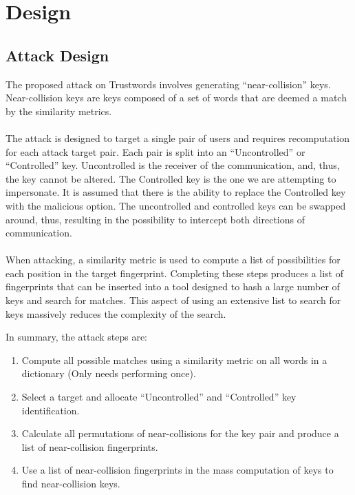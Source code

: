 \section{Design}

\subsection{Attack Design}
\label{sec:attackDesign}
The proposed attack on Trustwords involves generating ``near-collision'' keys. Near-collision keys are keys composed of a set of words that are deemed a match by the similarity metrics.
\\\\
The attack is designed to target a single pair of users and requires recomputation for each attack target pair. Each pair is split into an ``Uncontrolled'' or ``Controlled'' key. Uncontrolled is the receiver of the communication, and, thus, the key cannot be altered. The Controlled key is the one we are attempting to impersonate. It is assumed that there is the ability to replace the Controlled key with the malicious option. The uncontrolled and controlled keys can be swapped around, thus, resulting in the possibility to intercept both directions of communication.
\\\\
When attacking, a similarity metric is used to compute a list of possibilities for each position in the target fingerprint. Completing these steps produces a list of fingerprints that can be inserted into a tool designed to hash a large number of keys and search for matches. This aspect of using an extensive list to search for keys massively reduces the complexity of the search.

In summary, the attack steps are:
\begin{enumerate}
    \item Compute all possible matches using a similarity metric on all words in a dictionary (Only needs performing once).

    \item Select a target and allocate ``Uncontrolled'' and ``Controlled'' key identification.
    
    \item Calculate all permutations of near-collisions for the key pair and produce a list of near-collision fingerprints.
    
    \item Use a list of near-collision fingerprints in the mass computation of keys to find near-collision keys.

\end{enumerate}

